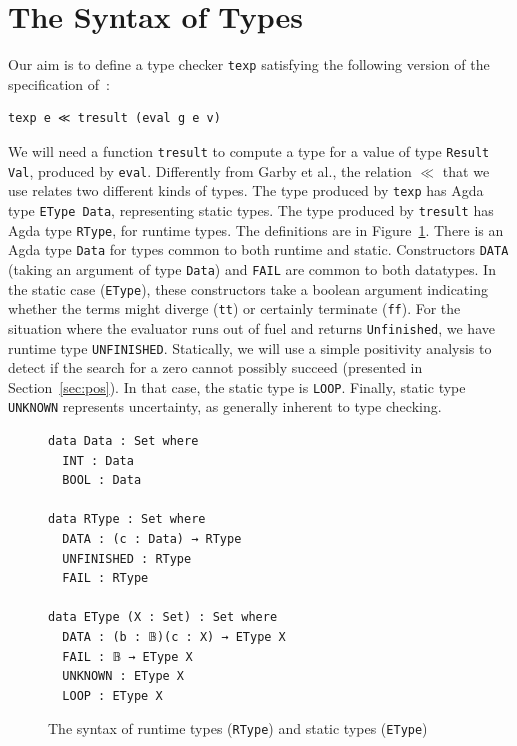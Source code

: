 \documentclass[acmsmall,screen,review]{acmart}
\begin{document}
\section{The Syntax of Types}

Our aim is to define a type checker \verb|texp| satisfying the following version of the specification of~\citet{garby+25}:

\begin{verbatim}
texp e ≪ tresult (eval g e v)
\end{verbatim}

\noindent We will need a function \verb|tresult| to compute a type for
a value of type \verb|Result Val|, produced by \verb|eval|.
Differently from Garby et al., the relation $\ll$ that we use relates
two different kinds of types.  The type produced by \verb|texp| has
Agda type \verb|EType Data|, representing static types.  The type
produced by \verb|tresult| has Agda type \verb|RType|, for runtime
types.  The definitions are in Figure~\ref{fig:syntp}.  There is an
Agda type \verb|Data| for types common to both runtime and static.
Constructors \verb|DATA| (taking an argument of type \verb|Data|) and
\verb|FAIL| are common to both datatypes.  In the static case
(\verb|EType|), these constructors take a boolean argument indicating
whether the terms might diverge (\verb|tt|) or certainly terminate
(\verb|ff|).  For the situation where the evaluator runs out of
fuel and returns \verb|Unfinished|, we have runtime type
\verb|UNFINISHED|.  Statically, we will use a simple positivity
analysis to detect if the search for a zero cannot possibly succeed (presented in Section~\ref{sec:pos}).
In that case, the static type is \verb|LOOP|.  Finally, static type
\verb|UNKNOWN| represents uncertainty, as generally inherent to type
checking.

\begin{figure}
\begin{verbatim}
data Data : Set where
  INT : Data
  BOOL : Data

data RType : Set where
  DATA : (c : Data) → RType
  UNFINISHED : RType
  FAIL : RType

data EType (X : Set) : Set where
  DATA : (b : 𝔹)(c : X) → EType X
  FAIL : 𝔹 → EType X
  UNKNOWN : EType X
  LOOP : EType X
\end{verbatim}
\caption{The syntax of runtime types (\texttt{RType}) and static types (\texttt{EType})}
\label{fig:syntp}
\end{figure}
\end{document}
